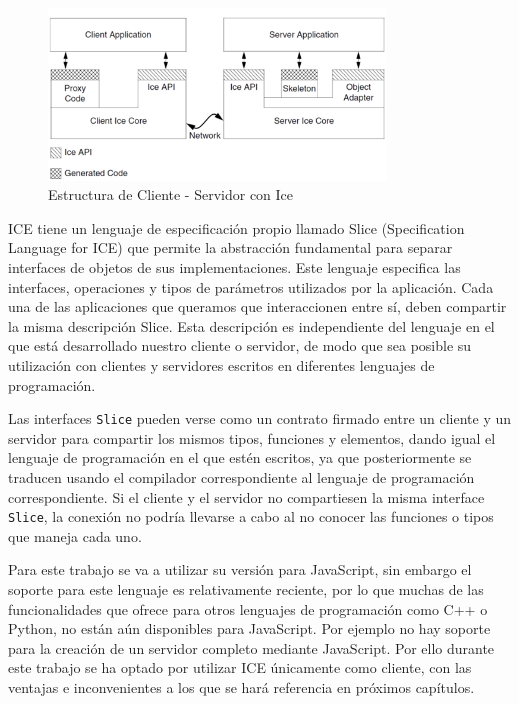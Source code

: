\begin{figure}[H]
  \begin{center}
    \includegraphics[width=0.8\textwidth]{figures/estructuraice.png}
		\caption{Estructura de Cliente - Servidor con Ice}
		\label{fig.estructurarice}
		\end{center}
\end{figure}

ICE tiene un lenguaje de especificación propio llamado Slice (Specification Language for ICE) que permite la abstracción fundamental para separar interfaces de objetos de sus implementaciones. Este lenguaje especifica las interfaces, operaciones y tipos de parámetros utilizados por la aplicación. Cada una de las aplicaciones que queramos que interaccionen entre sí, deben compartir la misma descripción Slice. Esta descripción es independiente del lenguaje en el que está desarrollado nuestro cliente o servidor, de modo que sea posible su utilización con clientes y servidores escritos en diferentes lenguajes de programación.

Las interfaces \texttt{Slice} pueden verse como un contrato firmado entre un cliente y un servidor para compartir los mismos tipos, funciones y elementos, dando igual el lenguaje de programación en el que estén escritos, ya que posteriormente se traducen usando el compilador correspondiente al lenguaje de programación correspondiente. Si el cliente y el servidor no compartiesen la misma interface \texttt{Slice}, la conexión no podría llevarse a cabo al no conocer las funciones o tipos que maneja cada uno.

Para este trabajo se va a utilizar su versión para JavaScript, sin embargo el soporte para este lenguaje es relativamente reciente, por lo que muchas de las funcionalidades que ofrece para otros lenguajes de programación como C++ o Python, no están aún disponibles para JavaScript. Por ejemplo no hay soporte para la creación de un servidor completo mediante JavaScript. Por ello durante este trabajo se ha optado por utilizar ICE únicamente como cliente, con las ventajas e inconvenientes a los que se hará referencia en próximos capítulos.

